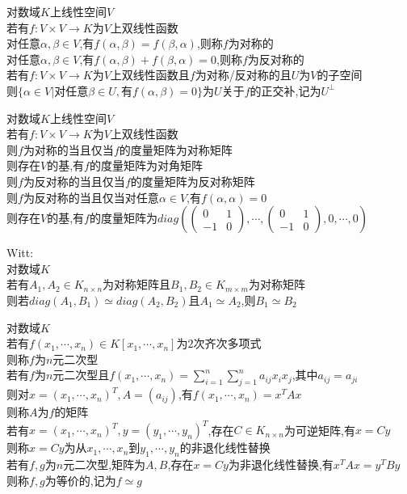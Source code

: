 \begin{dingyi}
对数域$K$上线性空间$V$\\
若有$f:V\times V\to K$为$V$上双线性函数\\
对任意$\alpha,\beta\in V$,有$f(\alpha,\beta)=f(\beta,\alpha)$,则称$f$为对称的\\
对任意$\alpha,\beta\in V$,有$f(\alpha,\beta)+f(\beta,\alpha)=0$,则称$f$为反对称的\\
若有$f:V\times V\to K$为$V$上双线性函数且$f$为对称/反对称的且$U$为$V$的子空间\\
则$\{\alpha\in V|\text{对任意}\beta\in U,\text{有}f(\alpha,\beta)=0\}$为$U$关于$f$的正交补,记为$U^{\perp}$
\end{dingyi}

\begin{dingli}
对数域$K$上线性空间$V$\\
若有$f:V\times V\to K$为$V$上双线性函数\\
则$f$为对称的当且仅当$f$的度量矩阵为对称矩阵\\
则存在$V$的基,有$f$的度量矩阵为对角矩阵\\
则$f$为反对称的当且仅当$f$的度量矩阵为反对称矩阵\\
则$f$为反对称的当且仅当对任意$\alpha\in V$,有$f(\alpha,\alpha)=0$\\
则存在$V$的基,有$f$的度量矩阵为$diag(\begin{pmatrix}0&1\\-1&0\end{pmatrix},\cdots,\begin{pmatrix}0&1\\-1&0\end{pmatrix},0,\cdots,0)$
\end{dingli}

\begin{dingli}
Witt:\\
对数域$K$\\
若有$A_1,A_2\in K_{n\times n}$为对称矩阵且$B_1,B_2\in K_{m\times m}$为对称矩阵\\
则若$diag(A_1,B_1)\simeq diag(A_2,B_2)$且$A_1\simeq A_2$,则$B_1\simeq B_2$
\end{dingli}

\begin{dingyi}
对数域$K$\\
若有$f(x_1,\cdots,x_n)\in K[x_1,\cdots,x_n]$为$2$次齐次多项式\\
则称$f$为$n$元二次型\\
若有$f$为$n$元二次型且$f(x_1,\cdots,x_n)=\sum\limits_{i=1}^{n}\sum\limits_{j=1}^{n}a_{ij}x_ix_j$,其中$a_{ij}=a_{ji}$\\
则对$x=(x_1,\cdots,x_n)^{T},A=(a_{ij})$,有$f(x_1,\cdots,x_n)=x^{T}Ax$\\
则称$A$为$f$的矩阵\\
若有$x=(x_1,\cdots,x_n)^{T},y=(y_1,\cdots,y_n)^{T}$,存在$C\in K_{n\times n}$为可逆矩阵,有$x=Cy$\\
则称$x=Cy$为从$x_1,\cdots,x_n$到$y_1,\cdots,y_n$的非退化线性替换\\
若有$f,g$为$n$元二次型,矩阵为$A,B$,存在$x=Cy$为非退化线性替换,有$x^{T}Ax=y^{T}By$\\
则称$f,g$为等价的,记为$f\simeq g$
\end{dingyi}

